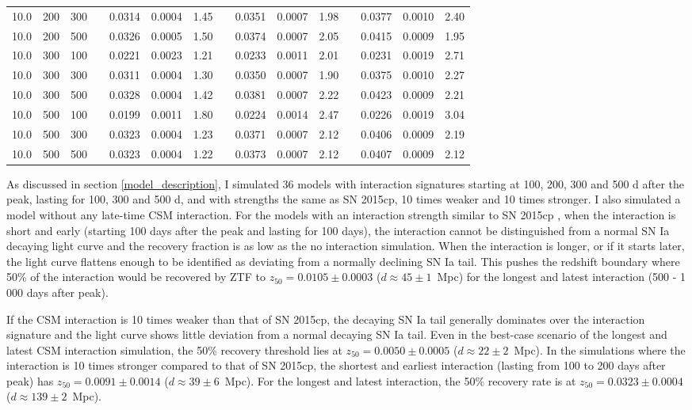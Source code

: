 \documentclass[a4paper,oneside,12pt, class=Latex/Classes/PhDthesisPSnPDF, crop=false]{standalone}
\begin{document}
\begin{table}
{\begin{tabular}{cccclcrclcrclcr}
  10.0 & 200 & 300 && 0.0314 & 0.0004 & 1.45 && 0.0351 & 0.0007 & 1.98 && 0.0377 & 0.0010 & 2.40\\
  10.0 & 200 & 500 && 0.0326 & 0.0005 & 1.50 && 0.0374 & 0.0007 & 2.05 && 0.0415 & 0.0009 & 1.95\\
  10.0 & 300 & 100 && 0.0221 & 0.0023 & 1.21 && 0.0233 & 0.0011 & 2.01 && 0.0231 & 0.0019 & 2.71\\
  10.0 & 300 & 300 && 0.0311 & 0.0004 & 1.30 && 0.0350 & 0.0007 & 1.90 && 0.0375 & 0.0010 & 2.27\\
  10.0 & 300 & 500 && 0.0328 & 0.0004 & 1.42 && 0.0381 & 0.0007 & 2.22 && 0.0423 & 0.0009 & 2.21\\
  10.0 & 500 & 100 && 0.0199 & 0.0011 & 1.80 && 0.0224 & 0.0014 & 2.47 && 0.0226 & 0.0019 & 3.04\\
  10.0 & 500 & 300 && 0.0323 & 0.0004 & 1.23 && 0.0371 & 0.0007 & 2.12 && 0.0406 & 0.0009 & 2.19\\
  10.0 & 500 & 500 && 0.0323 & 0.0004 & 1.22 && 0.0373 & 0.0007 & 2.12 && 0.0407 & 0.0009 & 2.12\\
  \hline
 \end{tabular}
 }
 \label{sim_z50_results}
\end{table}

As discussed in section \ref{model_description}, I simulated 36 models with interaction signatures starting at 100, 200, 300 and 500 d after the peak, lasting for 100, 300 and 500 d, and with strengths the same as SN 2015cp, 10 times weaker and 10 times stronger. I also simulated a model without any late-time CSM interaction. For the models with an interaction strength similar to SN 2015cp \citep{2015cp}, when the interaction is short and early (starting 100 days after the peak and lasting for 100 days), the interaction cannot be distinguished from a normal SN Ia decaying light curve and the recovery fraction is as low as the no interaction simulation. When the interaction is longer, or if it starts later, the light curve flattens enough to be identified as deviating from a normally declining SN Ia tail. This pushes the redshift boundary where 50\% of the interaction would be recovered by ZTF to $z_{50} = 0.0105 \pm 0.0003$ ($d\approx45 \pm 1$~Mpc) for the longest and latest interaction (500 - 1\,000 days after peak).

If the CSM interaction is 10 times weaker than that of SN 2015cp, the decaying SN Ia tail generally dominates over the interaction signature and the light curve shows little deviation from a normal decaying SN Ia tail. Even in the best-case scenario of the longest and latest CSM interaction simulation, the 50\% recovery threshold lies at $z_{50} = 0.0050 \pm 0.0005$ ($d\approx22 \pm 2$~Mpc). In the simulations where the interaction is 10 times stronger compared to that of SN 2015cp, the shortest and earliest interaction (lasting from 100 to 200 days after peak) has $z_{50} = 0.0091 \pm 0.0014$ ($d\approx39 \pm 6$~Mpc). For the longest and latest interaction, the 50\% recovery rate is at $z_{50} = 0.0323 \pm 0.0004$ ($d\approx139 \pm 2$~Mpc).
\end{document}
